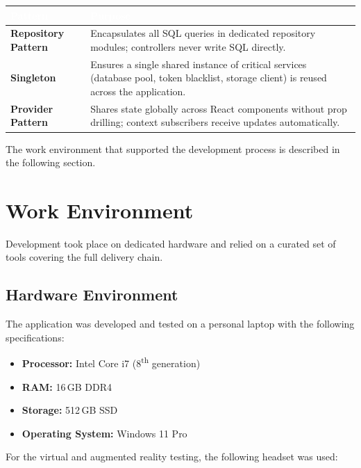 \begin{table}[H]
\centering
\renewcommand{\arraystretch}{1.4}
\begin{tabularx}{\textwidth}{|L{3.8cm}|X|}
\hline
{}
\textcolor{white}{\textbf{Pattern}} &
\textcolor{white}{\textbf{Purpose}} \\
\hline

\textbf{Repository Pattern} & Encapsulates all SQL queries in dedicated repository modules; controllers never write SQL directly. \\
\hline
\textbf{Singleton} & Ensures a single shared instance of critical services (database pool, token blacklist, storage client) is reused across the application. \\
\hline
\textbf{Provider Pattern} & Shares state globally across React components without prop drilling; context subscribers receive updates automatically. \\
\hline
\end{tabularx}
\end{table}

The work environment that supported the development process is described in the following section.

\section{Work Environment}

Development took place on dedicated hardware and relied on a curated set of tools covering the full delivery chain.

\subsection{Hardware Environment}

The application was developed and tested on a personal laptop with the following
specifications:


\begin{itemize}[leftmargin=2em]
  \item \textbf{Processor:} Intel Core i7 (8\textsuperscript{th} generation)
  \item \textbf{RAM:} 16\,GB DDR4
  \item \textbf{Storage:} 512\,GB SSD
  \item \textbf{Operating System:} Windows 11 Pro
\end{itemize}
For the virtual and augmented reality testing, the following headset was used:

